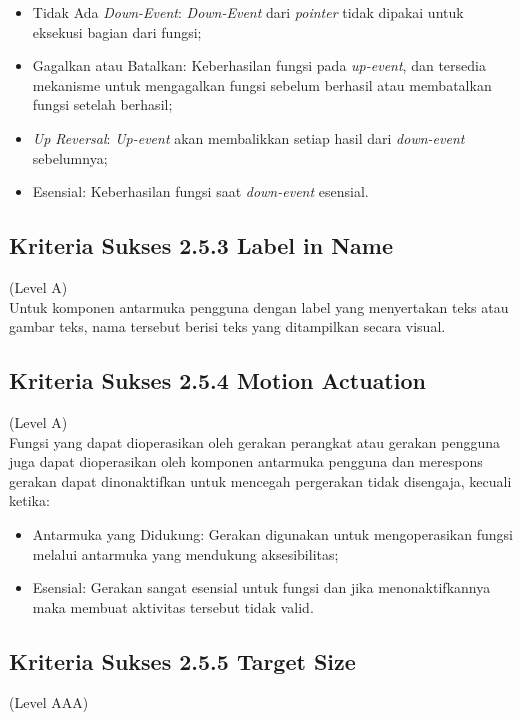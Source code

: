 \begin{itemize}
	\item Tidak Ada \textit{Down-Event}: \textit{Down-Event} dari \textit{pointer} tidak dipakai untuk eksekusi bagian dari fungsi;
	\item Gagalkan atau Batalkan: Keberhasilan fungsi pada \textit{up-event}, dan tersedia mekanisme untuk mengagalkan fungsi sebelum berhasil atau membatalkan fungsi setelah berhasil;
	\item \textit{Up Reversal}: \textit{Up-event} akan membalikkan setiap hasil dari \textit{down-event} sebelumnya;
	\item Esensial: Keberhasilan fungsi saat \textit{down-event} esensial.
\end{itemize}

\subsection{Kriteria Sukses 2.5.3 Label in Name}
\label{subsec:kriteria_2.5.3}
(Level A) \\

Untuk komponen antarmuka pengguna dengan label yang menyertakan teks atau gambar teks, nama tersebut berisi teks yang ditampilkan secara visual.

\subsection{Kriteria Sukses 2.5.4 Motion Actuation}
\label{subsec:kriteria_2.5.4}
(Level A) \\

Fungsi yang dapat dioperasikan oleh gerakan perangkat atau gerakan pengguna juga dapat dioperasikan oleh komponen antarmuka pengguna dan merespons gerakan dapat dinonaktifkan untuk mencegah pergerakan tidak disengaja, kecuali ketika:

\begin{itemize}
	\item Antarmuka yang Didukung: Gerakan digunakan untuk mengoperasikan fungsi melalui antarmuka yang mendukung aksesibilitas;
	\item Esensial: Gerakan sangat esensial untuk fungsi dan jika menonaktifkannya maka membuat aktivitas tersebut tidak valid.
\end{itemize}

\subsection{Kriteria Sukses 2.5.5 Target Size}
\label{subsec:kriteria_2.5.5}
(Level AAA) \\

